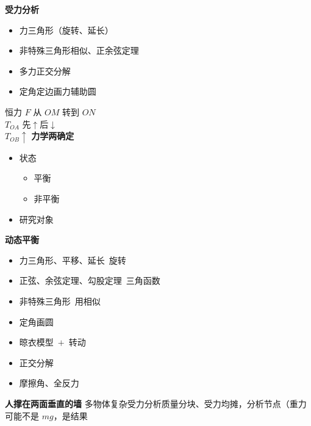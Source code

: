 \textbf{受力分析}
\begin{itemize}
\item 力三角形（旋转、延长）
\item 非特殊三角形\quad 相似、正余弦定理
\item 多力正交分解
\item 定角定边画力辅助圆
\end{itemize}
恒力 $F$ 从 $OM$ 转到 $ON$ \\
$T_{OA}$ 先$\uparrow$后$\downarrow$ \\
$T_{OB}\uparrow$
\textbf{力学两确定}
\begin{itemize}
\item 状态
  \begin{itemize}
  \item 平衡
  \item 非平衡
  \end{itemize}
\item 研究对象
\end{itemize}
\textbf{动态平衡}
\begin{itemize}
\item 力三角形、平移、延长\ 旋转
\item 正弦、余弦定理、勾股定理\ 三角函数
\item 非特殊三角形\ 用相似
\item 定角画圆
\item 晾衣模型\ $+$\ 转动 %
\item 正交分解
\item 摩擦角、全反力
\end{itemize}
\textbf{人撑在两面垂直的墙}
多物体复杂受力分析\quad 质量分块、受力均摊，分析节点（重力可能不是 $mg$，是结果 %
